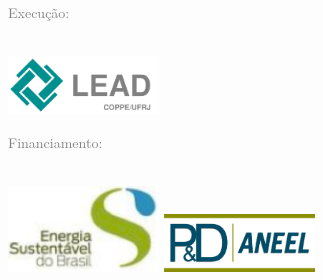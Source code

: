 





\thispagestyle{empty}


\hypersetup{pageanchor=false}

\vspace{4cm}

 \textcolor{gray}{Execução:} \\
\\
\begin{minipage}{\textwidth}
	\centering
       
	\includegraphics[width=0.3\textwidth]{logo/lead-logo}
	
\end{minipage}

\vspace{2cm}

\textcolor{gray}{Financiamento: } \\ 
\\
\begin{minipage}{\textwidth}
	\centering
	
	\includegraphics[width=0.3\textwidth]{logo/esbr-logo}
	\includegraphics[width=0.3\textwidth]{logo/aneel-logo}

	
\end{minipage}

